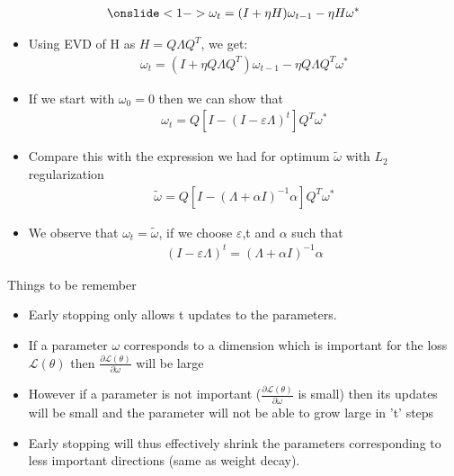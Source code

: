 \begin{frame}
	\begin{align*}
		\onslide<1->\omega_t=(I+\eta H)\omega_{t-1}-\eta H \omega^{*} 
	\end{align*}
	\begin{itemize}
		\justifying
		\item<2-> Using EVD of H as $H=Q \Lambda Q^{T}$, we get:
		\begin{align*}
			\omega_t=(I+\eta Q \Lambda Q^{T} )\omega_{t-1}-\eta Q \Lambda Q^{T} \omega^{*} 
		\end{align*}
		\item<3-> If we start with $\omega_{0}=0$ then we can show that
		\begin{align*}
			\omega_t=Q[I-(I-\varepsilon \Lambda)^{t}]Q^{T}\omega^{*} 
		\end{align*}
		\item<4-> Compare this with the expression we had for optimum $\tilde{\omega}$ with $L_2$ regularization
		\begin{align*}
			\tilde{\omega}=Q[I-(\Lambda+ \alpha I)^{-1} \alpha]Q^{T}\omega^{*} 
		\end{align*}
		\item<5-> We observe that $\omega_t=\tilde{\omega}$, if we choose $
		\varepsilon$,t and $\alpha$ such that 
		\begin{align*}
			(I-\varepsilon \Lambda)^{t}=(\Lambda+ \alpha I)^{-1} \alpha 
		\end{align*}
	\end{itemize}
\end{frame}

\begin{frame}
	\begin{block}{Things to be remember}
		\begin{itemize}
			\justifying
			\item<1-> Early stopping only allows t updates to the parameters.
			\item<2-> If a parameter $\omega$ corresponds to a dimension which is important for the loss $\mathscr{L}(\theta)$ then $\frac{\partial \mathscr{L}(\theta)}{\partial \omega}$ will be large
			\item<4-> However if a parameter is not important ($\frac{\partial \mathscr{L}(\theta)}{\partial \omega}$ is small) then its updates will be small and the parameter will not be able to grow large in 't' steps
			\item<5-> Early stopping will thus effectively shrink the parameters corresponding to less important directions (same as weight decay).
		\end{itemize}
	\end{block}
\end{frame}
